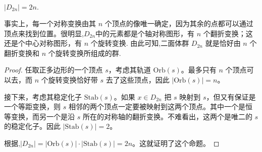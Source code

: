 \documentclass[../../main.tex]{subfiles}
\begin{document}
\begin{example}
$|D_{2n}| = 2n.$
\end{example}
\begin{note}
事实上，每一个对称变换由其 $n$ 个顶点的像唯一确定，因为其余的点都可以通过顶点来找到位置。很明显,$D_{2n}$中的元素都是个轴对称图形，有 $n$ 个翻折变换；这还是个中心对称图形，有 $n$ 个旋转变换.
由此可知,二面体群 $D_{2n}$ 就是恰好由 $n$ 个翻折变换和 $n$ 个旋转变换所组成的群.
\end{note}
\begin{proof}
任取正多边形的一个顶点 $s$，考虑其轨道 $\mathrm{Orb}(s)$。最多只有 $n$ 个顶点可以去，而 $n$ 个旋转变换恰好带 $s$ 去了这些顶点，因此 $|\mathrm{Orb}(s)| = n$。

接下来，考虑其稳定化子 $\mathrm{Stab}(s)$。如果 $x\in D_{2n}$ 把 $s$ 映射到 $s$，但又有保证是一个等距变换，则 $s$ 相邻的两个顶点一定要被映射到这两个顶点。其中一个是恒等变换，而另一个是沿 $s$ 所在的对称轴的翻折变换。不难看出，这两个是唯二的 $s$ 的稳定化子。因此 $|\mathrm{Stab}(s)| = 2$。

根据,$|D_{2n}| = |\mathrm{Orb}(s)|\cdot|\mathrm{Stab}(s)| = 2n$。这就证明了这个命题。
\end{proof}
\end{document}
